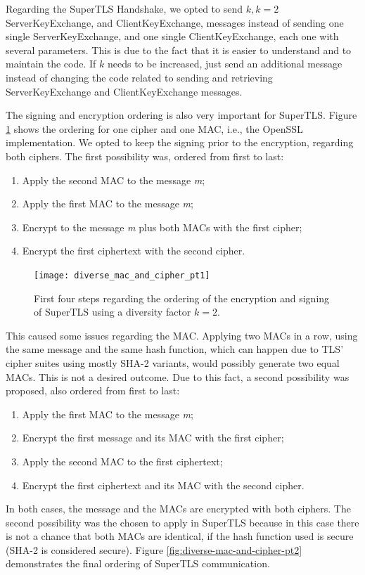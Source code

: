 \documentclass{sig-alternate-05-2015}
\begin{document}
Regarding the SuperTLS Handshake, we opted to send $k, k = 2$ ServerKeyExchange, and ClientKeyExchange, messages instead of sending one single ServerKeyExchange, and one single ClientKeyExchange, each one with several parameters. This is due to the fact that it is easier to understand and to maintain the code. If $k$ needs to be increased, just send an additional message instead of changing the code related to sending and retrieving ServerKeyExchange and ClientKeyExchange messages.

The signing and encryption ordering is also very important for SuperTLS. Figure \ref{fig:diverse-mac-and-cipher-pt1} shows the ordering for one cipher and one MAC, i.e., the OpenSSL implementation. We opted to keep the signing prior to the encryption, regarding both ciphers.
The first possibility was, ordered from first to last:
\begin{enumerate}
\item{Apply the second MAC to the message \textit{m};}
\item{Apply the first MAC to the message \textit{m};}
\item{Encrypt to the message \textit{m} plus both MACs with the first cipher;}
\item{Encrypt the first ciphertext with the second cipher.}
\end{enumerate}

\begin{figure}[t]
\texttt{[image: diverse\_mac\_and\_cipher\_pt1]}
\centering
\caption{First four steps regarding the ordering of the encryption and signing of SuperTLS using a diversity factor $k = 2$.}
\label{fig:diverse-mac-and-cipher-pt1}
\end{figure}

This caused some issues regarding the MAC. Applying two MACs in a row, using the same message and the same hash function, which can happen due to TLS' cipher suites using mostly SHA-2 variants, would possibly generate two equal MACs. This is not a desired outcome.
Due to this fact, a second possibility was proposed, also ordered from first to last:
\begin{enumerate}
\item{Apply the first MAC to the message \textit{m};}
\item{Encrypt the first message and its MAC with the first cipher;}
\item{Apply the second MAC to the first ciphertext;}
\item{Encrypt the first ciphertext and its MAC with the second cipher.}
\end{enumerate}
In both cases, the message and the MACs are encrypted with both ciphers. The second possibility was the chosen to apply in SuperTLS because in this case there is not a chance that both MACs are identical, if the hash function used is secure (SHA-2 is considered secure).
Figure \ref{fig:diverse-mac-and-cipher-pt2} demonstrates the final ordering of SuperTLS communication.
\end{document}
